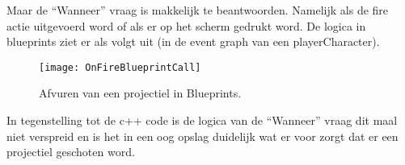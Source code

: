 Maar de “Wanneer” vraag is makkelijk te beantwoorden. Namelijk als de fire actie uitgevoerd word of als er op het scherm gedrukt word. De logica in blueprints ziet er als volgt uit (in de event graph van een playerCharacter).

\begin{figure}[!ht]
  \centering
    \texttt{[image: OnFireBlueprintCall]}
    \caption{Afvuren van een projectiel in Blueprints.}
\end{figure}

In tegenstelling tot de c++ code is de logica van de “Wanneer” vraag dit maal niet verspreid en is het in een oog opslag duidelijk wat er voor zorgt dat er een projectiel geschoten word.